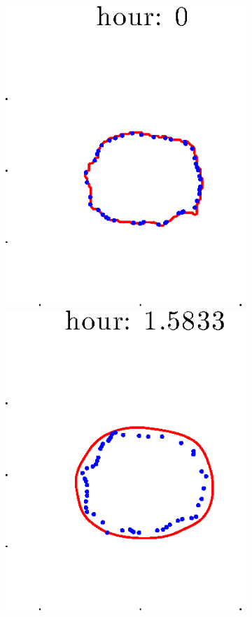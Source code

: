 \documentclass[12pt]{article}
\begin{document}
\begin{figure}[h!]
\begin{subfigure}[b]{.3\textwidth}
	\end{subfigure}
	\begin{subfigure}[b]{.3\textwidth}
	\centering
		\includegraphics[height=.15\textheight]{Pos10exp2/full/second1.eps}
		\includegraphics[height=.15\textheight]{Pos10exp2/full/second2.eps}

\end{subfigure}
\end{figure}
\end{document}
